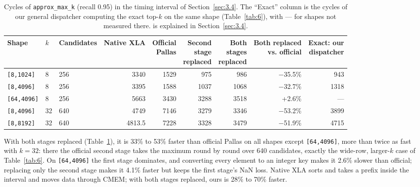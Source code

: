 \documentclass[sigconf,nonacm,balance=false]{acmart}
\newcommand{\code}[1]{\texttt{#1}}
\begin{document}
\begin{table}
\centering
\caption{Cycles of \code{approx\_\allowbreak{}max\_\allowbreak{}k} (recall 0.95) in the timing interval of Section~\ref{sec:3.4}. The ``Exact'' column is the cycles of our general dispatcher computing the exact top-$k$ on the same shape (Table~\ref{tab:6}), with --- for shapes not measured there. \ddag{} is explained in Section~\ref{sec:3.4}.}
\label{tab:21}
\begin{tabular}{lllrrrrrr}
\toprule
Shape & $k$ & Candidates & Native XLA & \makecell[rb]{Official\\Pallas} & \makecell[rb]{Second\\stage\\replaced} & \makecell[rb]{Both\\stages\\replaced} & \makecell[rb]{Both replaced\\vs. official} & \makecell[rb]{Exact: our\\dispatcher} \\
\midrule
\code{[8,\allowbreak{}1024]} & 8 & 256 & 3340\ddag{} & 1529 & 975 & 986 & $-$35.5\% & 943 \\
\code{[8,\allowbreak{}4096]} & 8 & 256 & 3395\ddag{} & 1588 & 1037 & 1068 & $-$32.7\% & 1318 \\
\code{[64,\allowbreak{}4096]} & 8 & 256 & 5663\ddag{} & 3430 & 3288 & 3518 & +2.6\% & --- \\
\code{[8,\allowbreak{}4096]} & 32 & 640 & 4749\ddag{} & 7146 & 3279 & 3346 & $-$53.2\% & 3899 \\
\code{[8,\allowbreak{}8192]} & 32 & 640 & 4813.5\ddag{} & 7228 & 3328 & 3479 & $-$51.9\% & 4715 \\
\bottomrule
\end{tabular}
\end{table}

With both stages replaced (Table~\ref{tab:21}), it is 33\% to 53\% faster than official Pallas on all shapes except \code{[64,\allowbreak{}4096]}, more than twice as fast with $k = 32$: there the official second stage takes the maximum round by round over 640 candidates, exactly the wide-row, larger-$k$ case of Table~\ref{tab:6}. On \code{[64,\allowbreak{}4096]} the first stage dominates, and converting every element to an integer key makes it 2.6\% slower than official; replacing only the second stage makes it 4.1\% faster but keeps the first stage's NaN loss. Native XLA sorts and takes a prefix inside the interval and moves data through CMEM; with both stages replaced, ours is 28\% to 70\% faster.
\end{document}
